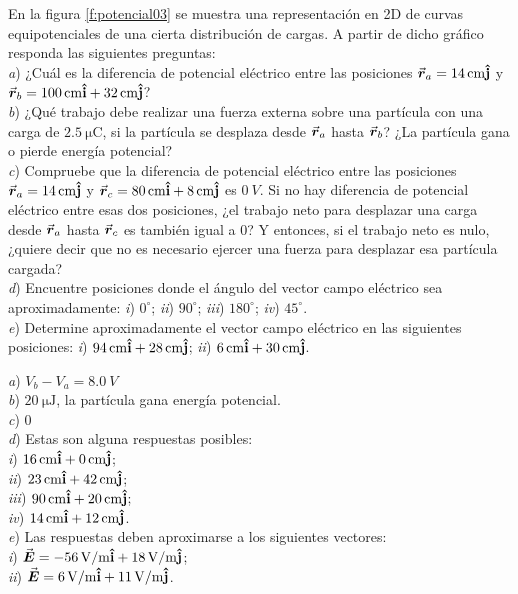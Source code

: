 %
\begin{Exercise}\label{p:potencial03}
  En la figura \ref{f:potencial03} se muestra una representación en 2D de curvas equipotenciales de una cierta distribución de cargas. A partir de dicho gráfico responda las siguientes preguntas:\\
  \textit{a}) ¿Cuál es la diferencia de potencial eléctrico entre las posiciones $\va*{r}_a = \SI{14}{cm}\vu{j}$ y $\va*{r}_b = \SI{100}{cm}\vu{i} + \SI{32}{cm}\vu{j}$?\\
  \textit{b}) ¿Qué trabajo debe realizar una fuerza externa sobre una partícula con una carga de $\SI{2.5}{\micro\coulomb}$, si la partícula se desplaza desde $\va*{r}_a$ hasta $\va*{r}_b$? ¿La partícula gana o pierde energía potencial?\\
  \textit{c}) Compruebe que la diferencia de potencial eléctrico entre las posiciones $\va*{r}_a = \SI{14}{cm}\vu{j}$ y $\va*{r}_c = \SI{80}{cm}\vu{i} + \SI{8}{cm}\vu{j}$ es $\SI{0}{V}$. Si no hay diferencia de potencial eléctrico entre esas dos posiciones, ¿el trabajo neto para desplazar una carga desde $\va*{r}_a$ hasta $\va*{r}_c$ es también igual a $0$? Y entonces, si el trabajo neto es nulo, ¿quiere decir que no es necesario ejercer una fuerza para desplazar esa partícula cargada?\\
  \textit{d}) Encuentre posiciones donde el ángulo del vector campo eléctrico sea aproximadamente: \textit{i}) $0^\circ$; \textit{ii}) $90^\circ$; \textit{iii}) $180^\circ$; \textit{iv}) $45^\circ$.\\
  \textit{e}) Determine aproximadamente el vector campo eléctrico en las siguientes posiciones: \textit{i}) $\SI{94}{cm}\vu{i} + \SI{28}{cm}\vu{j}$; \textit{ii}) $\SI{6}{cm}\vu{i} + \SI{30}{cm}\vu{j}$.
\end{Exercise}
\begin{Answer}
	\begin{minipage}[t]{.4\textwidth}
    \textit{a}) $V_b-V_a = \SI{8.0}{V}$\\
    \textit{b}) $\SI{20}{\micro\joule}$, la partícula gana energía potencial.\\
    \textit{c}) $0$\\
    \textit{d}) Estas son alguna respuestas posibles:\\
    \textit{i}) $\SI{16}{cm}\vu{i} + \SI{0}{cm}\vu{j}$;\\
    \textit{ii}) $\SI{23}{cm}\vu{i} + \SI{42}{cm}\vu{j}$;\\
    \textit{iii}) $\SI{90}{cm}\vu{i} + \SI{20}{cm}\vu{j}$;\\
    \textit{iv}) $\SI{14}{cm}\vu{i} + \SI{12}{cm}\vu{j}$.\\
    \textit{e}) Las respuestas deben aproximarse a los siguientes vectores:\\
    \textit{i}) $\va*{E} = \SI{-56}{V/m}\vu{i} +\SI{18}{V/m}\vu{j}$;\\
    \textit{ii}) $\va*{E} = \SI{6}{V/m}\vu{i} +\SI{11}{V/m}\vu{j}$.
  \end{minipage}
\end{Answer}
